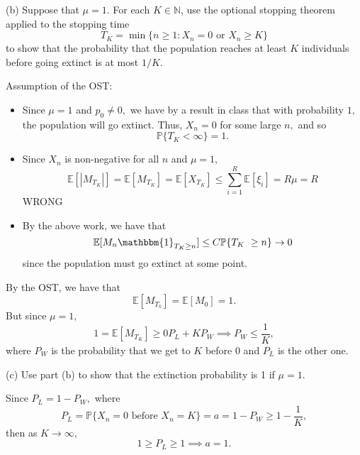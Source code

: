 \documentclass[11pt]{article}
\newcommand{\bbE}{\mathbb{E}}
\newcommand{\bbP}{\mathbb{P}}
\begin{document}
(b) Suppose that \(\mu = 1\). For each \(K \in \mathbb{N}\), use the optional stopping theorem applied to the stopping time
\[
T_K = \min\{n \geq 1 : X_n = 0 \text{ or } X_n \geq K\}
\]
to show that the probability that the population reaches at least \(K\) individuals before going extinct is at most \(1/K\).
\begin{solution}
    Assumption of the OST:
    \begin{itemize}
        \item Since $\mu = 1$ and $p_0 \neq 0,$ we have by a result in class that with probability $1,$ the population will go extinct. Thus, $X_n = 0$ for some large $n,$ and so  
        \[\bbP\{T_K < \infty\} = 1.\]
        \item Since $X_n$ is non-negative for all $n$ and $\mu = 1,$
        \[\bbE[|M_{T_K}|] = \bbE[M_{T_K}] = \bbE[X_{T_K}]  \leq \sum_{i=1}^R \bbE[\xi_i] = R\mu = R\] 
        WRONG
        \item By the above work, we have that 
        \[\bbE[M_n \mathbbm{1}_{T_K \geq n}] \leq C \bbP\{T_K\ \geq n\} \to 0\] since the population must go extinct at some point.
    \end{itemize}
    By the OST, we have that 
    \[\bbE[M_{T_k}] = \bbE[M_0] = 1.\] But since $\mu = 1,$
    \[1 =\bbE[M_{T_K}] \geq 0P_L + KP_W \implies P_W \leq \frac{1}{K},\] where $P_W$ is the probability that we get to $K$ before $0$ and $P_L$ is the other one.
\end{solution}

(c) Use part (b) to show that the extinction probability is 1 if \(\mu = 1\).
\begin{solution}
Since $P_L = 1-P_W,$ where 
\[P_L = \bbP\{X_n= 0 \text{ before }X_n = K\} = a = 1-P_W \geq 1-\frac{1}{K},\] then as $K\to \infty,$ 
\[1 \geq P_L \geq 1 \implies a = 1.\]
\end{solution}

\newpage
\end{document}

